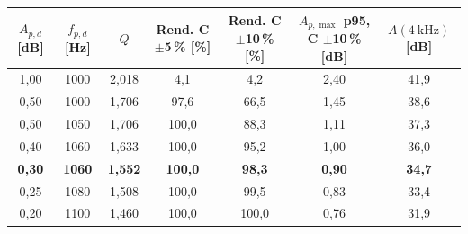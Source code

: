 \begin{tabular}{@{}ccccccc@{}}
\toprule
$A_{p,d}$ [dB] & $f_{p,d}$ [Hz] & $Q$ & Rend. C $\pm$5\,\% [\%] & Rend. C $\pm$10\,\% [\%] & $A_{p,\max}$ p95, C $\pm$10\,\% [dB] & $A(\qty{4}{\kilo\hertz})$ [dB] \\
\midrule
1{,}00 & 1000 & 2{,}018 & 4{,}1 & 4{,}2 & 2{,}40 & 41{,}9 \\
0{,}50 & 1000 & 1{,}706 & 97{,}6 & 66{,}5 & 1{,}45 & 38{,}6 \\
0{,}50 & 1050 & 1{,}706 & 100{,}0 & 88{,}3 & 1{,}11 & 37{,}3 \\
0{,}40 & 1060 & 1{,}633 & 100{,}0 & 95{,}2 & 1{,}00 & 36{,}0 \\
\textbf{0{,}30} & \textbf{1060} & \textbf{1{,}552} & \textbf{100{,}0} & \textbf{98{,}3} & \textbf{0{,}90} & \textbf{34{,}7} \\
0{,}25 & 1080 & 1{,}508 & 100{,}0 & 99{,}5 & 0{,}83 & 33{,}4 \\
0{,}20 & 1100 & 1{,}460 & 100{,}0 & 100{,}0 & 0{,}76 & 31{,}9 \\
\bottomrule
\end{tabular}